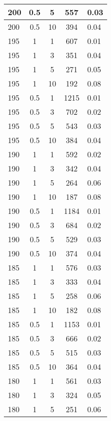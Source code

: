 \begin{longtable} {| p{3cm} | c | c | c | p{2cm} |}
	200 & 0.5 & 5  &  557  & 0.03            \\ \hline
	200 & 0.5 & 10 &  394  & 0.04            \\ \hline
	195 & 1 & 1  &  607    & 0.01          \\ \hline
	195 & 1 & 3  &  351    & 0.04          \\ \hline
	195 & 1 & 5  &  271    & 0.05          \\ \hline
	195 & 1 & 10 &  192    & 0.08          \\ \hline
	195 & 0.5 & 1  &  1215   & 0.01          \\ \hline
	195 & 0.5 & 3  &  702    & 0.02          \\ \hline
	195 & 0.5 & 5  &  543    & 0.03          \\ \hline
	195 & 0.5 & 10 &  384    & 0.04          \\ \hline
	190 & 1 & 1  &  592  & 0.02            \\ \hline
	190 & 1 & 3  &  342  & 0.04            \\ \hline
	190 & 1 & 5  &  264  & 0.06            \\ \hline
	190 & 1 & 10 &  187  & 0.08            \\ \hline
	190 & 0.5 & 1  &  1184 & 0.01            \\ \hline
	190 & 0.5 & 3  &  684  & 0.02            \\ \hline
	190 & 0.5 & 5  &  529  & 0.03            \\ \hline
	190 & 0.5 & 10 &  374  & 0.04            \\ \hline
	185 & 1 & 1  &  576    & 0.03          \\ \hline
	185 & 1 & 3  &  333    & 0.04          \\ \hline
	185 & 1 & 5  &  258    & 0.06          \\ \hline
	185 & 1 & 10 &  182    & 0.08          \\ \hline
	185 & 0.5 & 1  &  1153 & 0.01             \\ \hline
	185 & 0.5 & 3  &  666  & 0.02            \\ \hline
	185 & 0.5 & 5  &  515  & 0.03            \\ \hline
	185 & 0.5 & 10 &  364  & 0.04            \\ \hline
	180 & 1 & 1  &  561    & 0.03          \\ \hline
	180 & 1 & 3  &  324    & 0.05          \\ \hline
	180 & 1 & 5  &  251    & 0.06          \\ \hline

\end{longtable}
